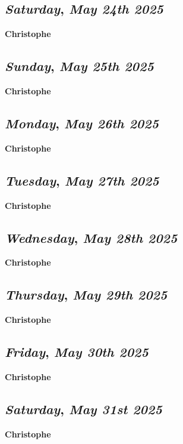 \def\day{\textit{May 24th 2025}}
\def\weekday{\textit{Saturday}}
\subsection*{\weekday, \day}
\textbf {Christophe}

\def\day{\textit{May 25th 2025}}
\def\weekday{\textit{Sunday}}
\subsection*{\weekday, \day}
\textbf {Christophe}

\def\day{\textit{May 26th 2025}}
\def\weekday{\textit{Monday}}
\subsection*{\weekday, \day}
\textbf {Christophe}

\def\day{\textit{May 27th 2025}}
\def\weekday{\textit{Tuesday}}
\subsection*{\weekday, \day}
\textbf {Christophe}

\def\day{\textit{May 28th 2025}}
\def\weekday{\textit{Wednesday}}
\subsection*{\weekday, \day}
\textbf {Christophe}

\def\day{\textit{May 29th 2025}}
\def\weekday{\textit{Thursday}}
\subsection*{\weekday, \day}
\textbf {Christophe}

\def\day{\textit{May 30th 2025}}
\def\weekday{\textit{Friday}}
\subsection*{\weekday, \day}
\textbf {Christophe}

\def\day{\textit{May 31st 2025}}
\def\weekday{\textit{Saturday}}
\subsection*{\weekday, \day}
\textbf {Christophe}
